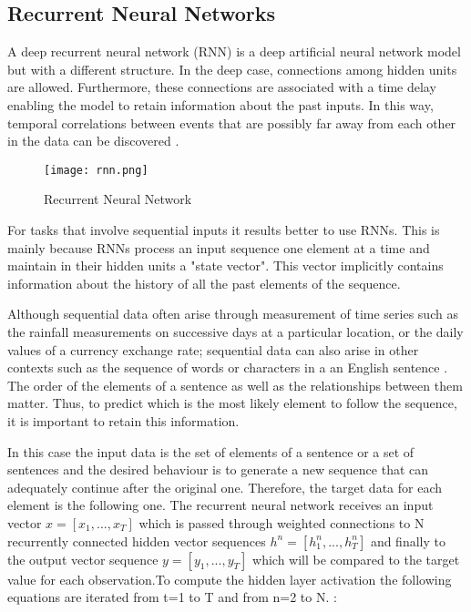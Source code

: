 \subsection{Recurrent Neural Networks}

A deep recurrent neural network (RNN) is a deep artificial neural network model but with a different structure. In the deep case, connections among hidden units are allowed. Furthermore, these connections are associated with a time delay enabling the model to retain information about the past inputs. In this way, temporal correlations between events that are possibly far away from each other in the data can be discovered \cite{pascanu2013difficulty}.

\begin{figure}
\label{fig:rnn}
\center
\texttt{[image: rnn.png]}
\caption{Recurrent Neural Network}
\end{figure}
For tasks that involve sequential inputs it results better to use RNNs. This is mainly because RNNs process an input sequence one element at a time and maintain in their hidden units a "state vector". This vector implicitly contains information about the history of all the past elements of the sequence.\cite{lecun2015deep} 

Although sequential data often arise through measurement of time series such as the rainfall measurements on successive days at a particular location, or the daily values of a currency exchange rate; sequential data can also arise in other contexts such as the sequence of words or characters in a an English sentence \cite{bishop2006pattern}. The order of the elements of a sentence as well as the relationships between them matter. Thus, to predict which is the most likely element to follow the sequence, it is important to retain this information.

In this case the input data is the set of elements of a sentence or a set of sentences and the desired behaviour is to generate a new sequence that can adequately continue after the original one. Therefore, the target data for each element is the following one. The recurrent neural network receives an input vector $x=[x_1,...,x_T]$ which is passed through weighted connections to N recurrently connected hidden vector sequences $h^n=[h_1^n,...,h_T^n]$ and finally to the output vector sequence $y=[y_1,...,y_T]$ which will be compared to the target value for each observation.To compute the hidden layer activation the following equations are iterated from t=1 to T and from n=2 to N. \cite{graves2013generating}:

